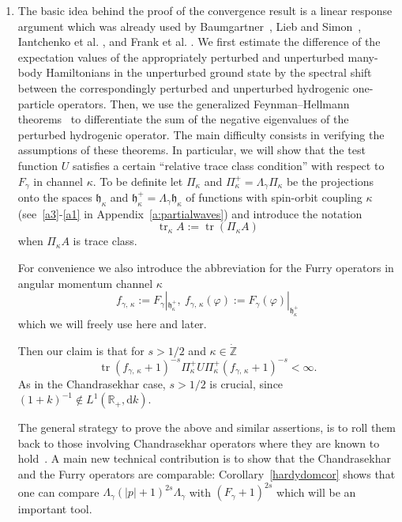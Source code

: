 \documentclass[AHL,Unicode,longabstracts,published]{cedram}
\DeclareMathOperator{\tr}{tr}
\newcommand*\rd{\mathrm{d}}
\newcommand*\gz{\mathbb{Z}}
\newcommand*\rz{\mathbb{R}}
\newcommand*\zp{\dot{\gz}}
\newcommand*\gh{\mathfrak{h}}
\newcommand*\ghk{{\gh_{\kappa}}}
\newcommand*\ghpk{{\gh^+_\kappa}}
\begin{document}
\begin{enumerate}
\item The basic idea behind the proof of the convergence result is a linear response argument which was already used by Baumgartner~\cite{Baumgartner1976}, Lieb and Simon~\cite{LiebSimon1977}, Iantchenko et al. \cite{Iantchenkoetal1996}, and Frank et al. \cite{Franketal2020R,Franketal2020P}. We first estimate the difference of the expectation values of the appropriately perturbed and unperturbed many-body Hamiltonians in the unperturbed ground state by the spectral shift between the correspondingly perturbed and unperturbed hydrogenic one-particle operators. Then, we use the generalized Feynman--Hellmann theorems~\cite[Theorem~3.2, Proposition~3.3]{Franketal2020P} to differentiate the sum of the negative eigenvalues of the perturbed hydrogenic operator. The main difficulty consists in verifying the assumptions of these theorems. In particular, we will show that the test function $U$ satisfies a certain ``relative trace class condition'' with respect to $F_\gamma$ in channel $\kappa$. To be definite let $\Pi_\kappa$ and $\Pi_\kappa^+=\Lambda_\gamma\Pi_\kappa$ be the projections onto the spaces $\ghk$ and $\ghpk=\Lambda_\gamma\ghk$ of functions with spin-orbit coupling $\kappa$ (see~\eqref{a3}-\eqref{a1} in Appendix~\ref{a:partialwaves}) and introduce the notation
\begin{equation}\label{ps}
\tr_\kappa A:= \tr\left(\Pi_\kappa A\right)
\end{equation}
when $\Pi_\kappa A$ is trace class.


For convenience we also introduce the abbreviation for the Furry operators in angular momentum channel $\kappa$
\begin{equation}\label{radialeops}
f_{\gamma,\,\kappa}:=F_\gamma|_\ghpk,\ f_{\gamma,\,\kappa}(\varphi):= F_\gamma(\varphi)|_\ghpk
\end{equation}
which we will freely use here and later.

Then our claim is that for $s>1/2$ and $\kappa\in\zp$
\[
\tr \left(f_{\gamma,\,\kappa}+1\right)^{-s}\Pi_\kappa^+U\Pi^+_\kappa\left(f_{\gamma,\,\kappa}+1\right)^{-s}<\infty.
\]
As in the Chandrasekhar case, $s>1/2$ is crucial, since $(1+k)^{-1}\notin L^1(\rz_+,\rd k)$.

The general strategy to prove the above and similar assertions, is to roll them back to those involving Chandrasekhar operators where they are known to hold~\cite[Corollary~4.5]{Franketal2020P}. A main new technical contribution is to show that the Chandrasekhar and the Furry operators are comparable: Corollary~\ref{hardydomcor} shows that one can compare $\Lambda_\gamma(|p|+1)^{2s}\Lambda_\gamma$ with $(F_\gamma+1)^{2s}$ which will be an important tool.
\end{enumerate}
\end{document}
